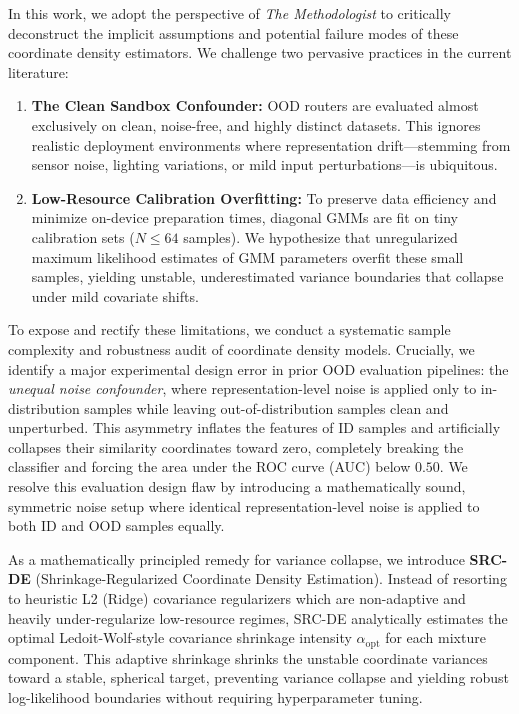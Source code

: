 In this work, we adopt the perspective of {\em The Methodologist} to critically deconstruct the implicit assumptions and potential failure modes of these coordinate density estimators. We challenge two pervasive practices in the current literature:
\begin{enumerate}
    \item {\bf The Clean Sandbox Confounder:} OOD routers are evaluated almost exclusively on clean, noise-free, and highly distinct datasets. This ignores realistic deployment environments where representation drift—stemming from sensor noise, lighting variations, or mild input perturbations—is ubiquitous.
    \item {\bf Low-Resource Calibration Overfitting:} To preserve data efficiency and minimize on-device preparation times, diagonal GMMs are fit on tiny calibration sets ($N \le 64$ samples). We hypothesize that unregularized maximum likelihood estimates of GMM parameters overfit these small samples, yielding unstable, underestimated variance boundaries that collapse under mild covariate shifts.
\end{enumerate}

To expose and rectify these limitations, we conduct a systematic sample complexity and robustness audit of coordinate density models. Crucially, we identify a major experimental design error in prior OOD evaluation pipelines: the {\em unequal noise confounder}, where representation-level noise is applied only to in-distribution samples while leaving out-of-distribution samples clean and unperturbed. This asymmetry inflates the features of ID samples and artificially collapses their similarity coordinates toward zero, completely breaking the classifier and forcing the area under the ROC curve (AUC) below $0.50$. We resolve this evaluation design flaw by introducing a mathematically sound, symmetric noise setup where identical representation-level noise is applied to both ID and OOD samples equally.

As a mathematically principled remedy for variance collapse, we introduce {\bf SRC-DE} (Shrinkage-Regularized Coordinate Density Estimation). Instead of resorting to heuristic L2 (Ridge) covariance regularizers which are non-adaptive and heavily under-regularize low-resource regimes, SRC-DE analytically estimates the optimal Ledoit-Wolf-style covariance shrinkage intensity $\alpha_{\text{opt}}$ for each mixture component. This adaptive shrinkage shrinks the unstable coordinate variances toward a stable, spherical target, preventing variance collapse and yielding robust log-likelihood boundaries without requiring hyperparameter tuning.

